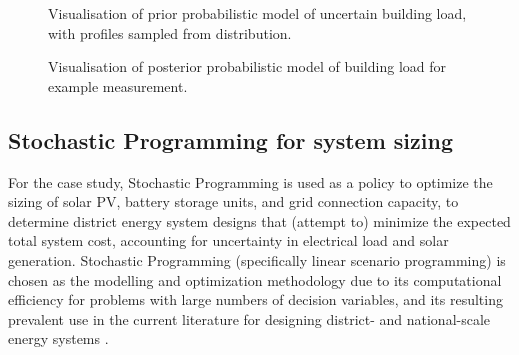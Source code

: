 \newcommand{\tsfw}{1}
\begin{figure}[!h]
    \centering

    \vspace*{-0.2cm}
    \caption{Visualisation of prior probabilistic model of uncertain building load, with profiles sampled from distribution.} \label{fig:districts-load-dist}
\end{figure}

\begin{figure}[ht]
    \centering

    \caption{Visualisation of posterior probabilistic model of building load for example measurement.} \label{fig:districts-post-load-dist}
\end{figure}


\clearpage
\subsection{Stochastic Programming for system sizing} \label{sec:districts-SP}


For the case study, Stochastic Programming is used as a policy to optimize the sizing of solar PV, battery storage units, and grid connection capacity, to determine district energy system designs that (attempt to) minimize the expected total system cost, accounting for uncertainty in electrical load and solar generation. Stochastic Programming (specifically linear scenario programming) is chosen as the modelling and optimization methodology due to its computational efficiency for problems with large numbers of decision variables, and its resulting prevalent use in the current literature for designing district- and national-scale energy systems \citep{decarolis2017FormalizingBestPractice,pickering2019DistrictEnergySystem,yue2018ReviewApproachesUncertainty,2024OpenEnergyModelling,yang2015MILPMixedInteger}.


